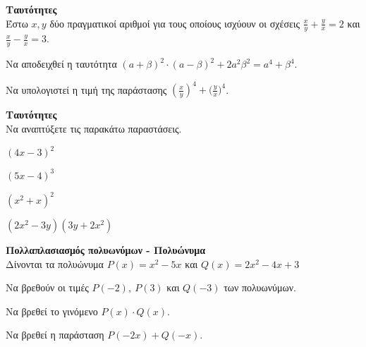 \documentclass[ektypwsh]{diag-xelatex}
\begin{document}
\begin{thema}
\item \textbf{Ταυτότητες}\\
Έστω $ x,y $ δύο πραγματικοί αριθμοί για τους οποίους ισχύουν οι σχέσεις $ \frac{x}{y}+\frac{y}{x}=2 $ και $ \frac{x}{y}-\frac{y}{x}=3 $.
\begin{rlist}
\item Να αποδειχθεί η ταυτότητα $ (a+\beta)^2\cdot(a-\beta)^2+2a^2\beta^2=a^4+\beta^4 $.
\item Να υπολογιστεί η τιμή της παράστασης $ \left( \frac{x}{y}\right)^4+\Big(\frac{y}{x}\Big)^4 $.
\end{rlist}
\item \textbf{Ταυτότητες}\\
Να αναπτύξετε τις παρακάτω παραστάσεις.
\begin{multicols}{2}
\begin{rlist}
\item $ (4x-3)^2 $
\item $ (5x-4)^3 $
\item $ (x^2+x)^2 $
\item $ (2x^2-3y)(3y+2x^2) $
\end{rlist}
\end{multicols}
\item \textbf{Πολλαπλασιασμός πολυωνύμων - Πολυώνυμα}\\
Δίνονται τα πολυώνυμα $ P(x)=x^2-5x $ και $ Q(x)=2x^2-4x+3 $
\begin{rlist}
\item Να βρεθούν οι τιμές $ P(-2),\ P(3) $ και $ Q(-3) $ των πολυωνύμων.
\item Να βρεθεί το γινόμενο $ P(x)\cdot Q(x) $.
\item Να βρεθεί η παράσταση $ P(-2x)+Q(-x) $.
\end{rlist}
\end{thema}
\kaliepityxia
\end{document}
